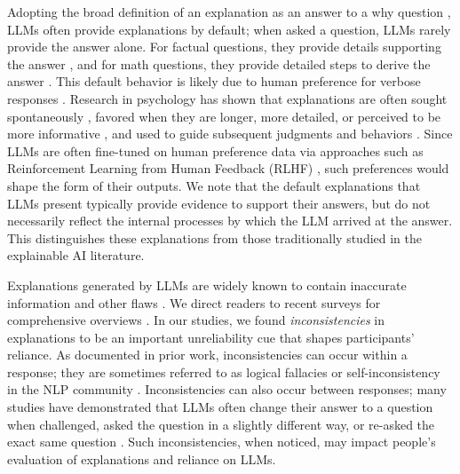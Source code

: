 Adopting the broad definition of an explanation as an answer to a why question \cite{Lombrozo2012,Wellman2011,bromberger1966why,Fraassen1980}, LLMs often provide explanations by default; when asked a question, LLMs rarely provide the answer alone. For factual questions, they provide details supporting the answer \cite{Lee2024FAccT,lfqa23}, and for math questions, they provide detailed steps to derive the answer \cite{Collins2024PNAS,hendrycks2021measuring}. 
This default behavior is likely due to human preference for verbose responses \cite{chiang2024overreasoning,saito2023verbosity,Zheng2020Verbose}.
Research in psychology has shown that explanations are often sought spontaneously \cite{malle1997behaviors,frazier2009preschoolers}, favored when they are longer, more detailed, or perceived to be more informative \cite{weisberg2015deconstructing,Zemla2017Everyday,bechlivanidis2017concreteness,Aronowitz2020TCS,Liquin2022Satisfaction}, and used to guide subsequent judgments and behaviors \cite{Lombrozo2023Selective,Lombrozo2016}. 
Since LLMs are often fine-tuned on human preference data via approaches such as Reinforcement Learning from Human Feedback (RLHF) \cite{ziegler2019finetuning,Christiano2017RLHF,Ouyang2024RLHF}, such preferences would shape the form of their outputs. We note that the default explanations that LLMs present typically provide evidence to support their answers, but do not necessarily reflect the internal processes by which the LLM arrived at the answer. This distinguishes these explanations from those traditionally studied in the explainable AI literature.


Explanations generated by LLMs are widely known to contain inaccurate information and other flaws \cite{Ji2023Hallucination,shuster2021eval,santhanam2022rome,Dahl2024Law}. We direct readers to recent surveys for comprehensive overviews \cite{huang2023hallucination,wang2023factuality}. In our studies, we found \textit{inconsistencies} in explanations to be an important unreliability cue that shapes participants' reliance. As documented in prior work, inconsistencies can occur within a response; they are sometimes referred to as logical fallacies or self-inconsistency in the NLP community \cite{huang2023reasoning,wang2023selfconsistency}. Inconsistencies can also occur between responses; many studies have demonstrated that LLMs often change their answer to a question when challenged, asked the question in a slightly different way, or re-asked the exact same question \cite{Lee2024FAccT,Elazar2021MeasuringAI,laban2024flipflop}. Such inconsistencies, when noticed, may impact people's evaluation of explanations and reliance on LLMs.



